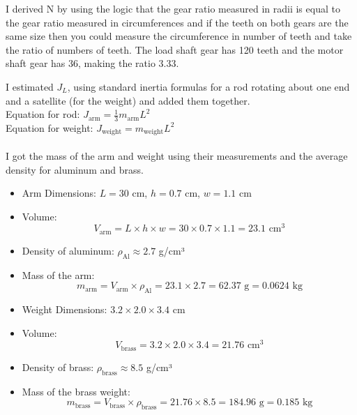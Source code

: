 \documentclass{article}
\begin{document}
I derived N by using the logic that the gear ratio measured in radii is equal to the gear ratio measured in circumferences and if the teeth on both gears are the same size then you could measure the circumference in number of teeth and take the ratio of numbers of teeth.
The load shaft gear has 120 teeth and the motor shaft gear has 36, making the ratio 3.33.

I estimated $J_L$, using standard inertia formulas for a rod rotating about one end and a satellite (for the weight) and added them together.
\\
Equation for rod:
$J_{\text{arm}} = \frac{1}{3} m_{\text{arm}} L^2$
\\
Equation for weight:
$J_{\text{weight}} = m_{\text{weight}} L^2$
\\
\\
I got the mass of the arm and weight using their measurements and the average density for aluminum and brass.
\begin{itemize}
    \item Arm Dimensions: \( L = 30 \) cm, \( h = 0.7 \) cm, \( w = 1.1 \) cm
    \item Volume:
    \begin{equation}
        V_{\text{arm}} = L \times h \times w = 30 \times 0.7 \times 1.1 = 23.1 \text{ cm}^3
    \end{equation}
    \item Density of aluminum: \( \rho_{\text{Al}} \approx 2.7 \) g/cm³
    \item Mass of the arm:
    \begin{equation}
        m_{\text{arm}} = V_{\text{arm}} \times \rho_{\text{Al}} = 23.1 \times 2.7 = 62.37 \text{ g} = 0.0624 \text{ kg}
    \end{equation}
\end{itemize}

\begin{itemize}
    \item Weight Dimensions: \( 3.2 \times 2.0 \times 3.4 \) cm
    \item Volume:
    \begin{equation}
        V_{\text{brass}} = 3.2 \times 2.0 \times 3.4 = 21.76 \text{ cm}^3
    \end{equation}
    \item Density of brass: \( \rho_{\text{brass}} \approx 8.5 \) g/cm³
    \item Mass of the brass weight:
    \begin{equation}
        m_{\text{brass}} = V_{\text{brass}} \times \rho_{\text{brass}} = 21.76 \times 8.5 = 184.96 \text{ g} = 0.185 \text{ kg}
    \end{equation}
\end{itemize}
\end{document}
